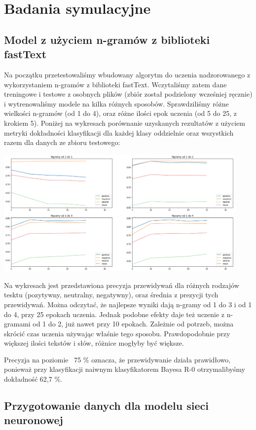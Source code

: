 \documentclass[11pt, a4paper, notitlepage]{report}
\begin{document}
\section{Badania symulacyjne}
\subsection{Model z użyciem n-gramów z biblioteki fastText}
Na początku przetestowaliśmy wbudowany algorytm do uczenia nadzorowanego z wykorzystaniem n-gramów z biblioteki fastText. Wczytaliśmy zatem dane treningowe i testowe z osobnych plików (zbiór został podzielony wcześniej ręcznie) i wytrenowaliśmy modele na kilka różnych sposobów.
Sprawdziliśmy różne wielkości n-gramów (od 1 do 4), oraz różne ilości epok uczenia (od 5 do 25, z krokiem 5). Poniżej na wykresach porównanie uzyskanych rezultatów z użyciem metryki dokładności klasyfikacji dla każdej klasy oddzielnie oraz wszystkich razem dla danych ze zbioru testowego:

\begin{center}
\includegraphics[width=350pt]{graphics/ngramy.png}
\end{center}

Na wykresach jest przedstawiona precyzja przewidywań dla różnych rodzajów tesktu (pozytywny, neutralny, negatywny), oraz średnia z prezycji tych przewidywań.
Można odczytać, że najlepsze wyniki dają n-gramy od 1 do 3 i od 1 do 4, przy 25 epokach uczenia.
Jednak podobne efekty daje też uczenie z n-gramami od 1 do 2, już nawet przy 10 epokach. Zależnie od potrzeb, można skrócić czas uczenia używając właśnie tego sposobu. Prawdopodobnie przy większej ilości tekstów i słów, różnice mogłyby być większe.

Precyzja na poziomie ~75 \% oznacza, że przewidywanie działa prawidłowo, ponieważ przy klasyfikacji naiwnym klasyfikatorem Bayesa R-0 otrzymalibyśmy dokładność 62,7 \%.

\subsection{Przygotowanie danych dla modelu sieci neuronowej}
\end{document}
